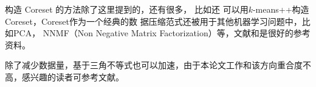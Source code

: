 构造 Coreset 的方法除了这里提到的，还有很多， 比如还
可以用$k$-means++构造Coreset，Coreset作为一个经典的数
据压缩范式还被用于其他机器学习问题中，比如PCA， NNMF（Non Negative Matrix Factorization）等，文献\cite{bachem2017practical}和\cite{feldman2013turning}是很好的参考资料。

除了减少数据量，基于三角不等式也可以加速，由于本论文工作和该方向重合度不高，感兴趣的读者可参考文献\cite{ding2015yinyang,elkan2003using,drake2012accelerated,newling2018novel}。
